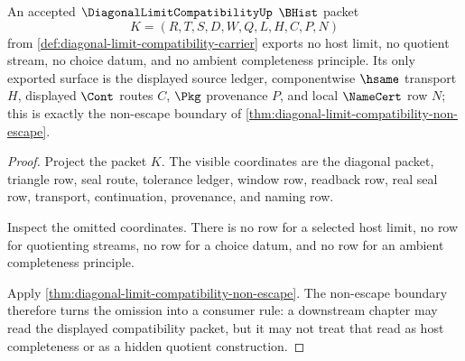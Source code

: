 \begin{theorem}
\label{thm:diagonal-limit-compatibility-ambient-completeness-refusal}
An accepted $\DiagonalLimitCompatibilityUp$ $\BHist$ packet
$$
K=(R,T,S,D,W,Q,L,H,C,P,N)
$$
from \autoref{def:diagonal-limit-compatibility-carrier} exports no host limit,
no quotient stream, no choice datum, and no ambient completeness principle.
Its only exported surface is the displayed source ledger, componentwise
$\hsame$ transport $H$, displayed $\Cont$ routes $C$, $\Pkg$ provenance $P$,
and local $\NameCert$ row $N$; this is exactly the non-escape boundary of
\autoref{thm:diagonal-limit-compatibility-non-escape}.
\end{theorem}
\begin{proof}
Project the packet $K$. The visible coordinates are the diagonal packet,
triangle row, seal route, tolerance ledger, window row, readback row, real
seal row, transport, continuation, provenance, and naming row.

Inspect the omitted coordinates. There is no row for a selected host limit,
no row for quotienting streams, no row for a choice datum, and no row for an
ambient completeness principle.

Apply \autoref{thm:diagonal-limit-compatibility-non-escape}. The non-escape
boundary therefore turns the omission into a consumer rule: a downstream
chapter may read the displayed compatibility packet, but it may not treat that
read as host completeness or as a hidden quotient construction.
\end{proof}

